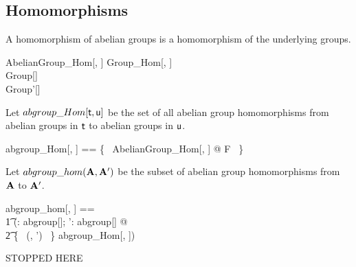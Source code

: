\documentclass{amsart}
\begin{document}
\subsection{Homomorphisms}

A homomorphism of abelian groups is a homomorphism of the underlying groups.

\begin{schema}{AbelianGroup\_Hom}[\genT, \genU]
	Group\_Hom[\genT, \genU] \\
	Group[\genT] \\
	Group'[\genU]
\end{schema}

Let $abgroup\_Hom[\mathsf{t}, \mathsf{u}]$ be the set of all abelian group homomorphisms
from abelian groups in $\mathsf{t}$ to abelian groups in $\mathsf{u}$.

\begin{zed}
	abgroup\_Hom[\genT, \genU] == \{~ AbelianGroup\_Hom[\genT, \genU] @ F ~\}
\end{zed}

Let $abgroup\_hom(\mathbf{A}, \mathbf{A}')$ be the subset of abelian group homomorphisms
from $\mathbf{A}$ to $\mathbf{A}'$.

\begin{zed}
	abgroup\_hom[\genT, \genU] == \\
	\t1	(\lambda \strucA: abgroup[\genT]; \strucA': abgroup[\genU] @ \\
	\t2		\{~ (\strucA, \strucA') ~\} \dres abgroup\_Hom[\genT, \genU])
\end{zed}

STOPPED HERE

\printbibliography
\end{document}
